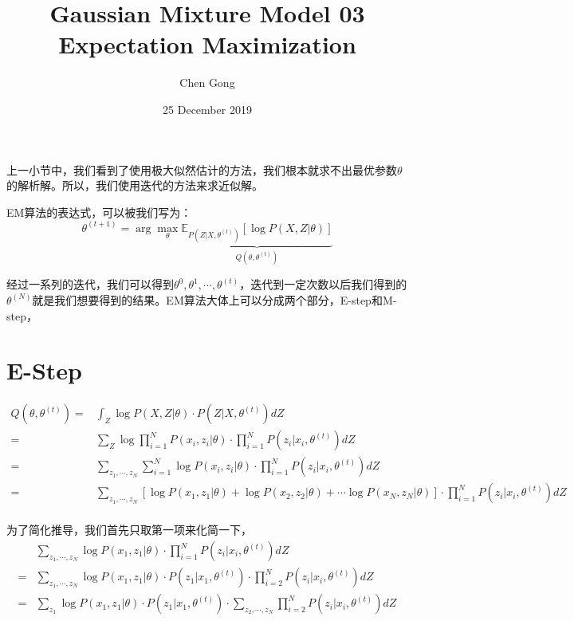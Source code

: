 \documentclass[a4paper]{article}
\title{Gaussian Mixture Model 03 Expectation Maximization}
\author{Chen Gong}
\date{25 December 2019}
\begin{document}
\maketitle
上一小节中，我们看到了使用极大似然估计的方法，我们根本就求不出最优参数$\theta$的解析解。所以，我们使用迭代的方法来求近似解。

EM算法的表达式，可以被我们写为：
\begin{equation}
    \theta^{(t+1)} = \arg\max_\theta \underbrace{\mathbb{E}_{P(Z|X,\theta^{(t)})} \left[ \log P(X,Z|\theta) \right]}_{Q(\theta,\theta^{(t)})}
\end{equation}

经过一系列的迭代，我们可以得到$\theta^{0},\theta^{1},\cdots,\theta^{(t)}$，迭代到一定次数以后我们得到的$\theta^{(N)}$就是我们想要得到的结果。EM算法大体上可以分成两个部分，E-step和M-step，

\section{E-Step}
\begin{equation}
    \begin{split}
        Q(\theta,\theta^{(t)}) 
        = & \int_Z \log P(X,Z|\theta)\cdot P(Z|X,\theta^{(t)}) dZ \\
        = & \sum_Z \log \prod_{i=1}^N P(x_i,z_i|\theta)\cdot \prod_{i=1}^N P(z_i|x_i,\theta^{(t)}) dZ \\
        = & \sum_{z_1,\cdots,z_N} \sum_{i=1}^N \log P(x_i,z_i|\theta)\cdot \prod_{i=1}^N P(z_i|x_i,\theta^{(t)}) dZ \\
        = & \sum_{z_1,\cdots,z_N} \left[ \log P(x_1,z_1|\theta) + \log P(x_2,z_2|\theta) + \cdots \log P(x_N,z_N|\theta) \right] \cdot \prod_{i=1}^N P(z_i|x_i,\theta^{(t)}) dZ \\
    \end{split}
\end{equation}

为了简化推导，我们首先只取第一项来化简一下，
\begin{equation}
    \begin{split}
        & \sum_{z_1,\cdots,z_N} \log P(x_1,z_1|\theta) \cdot \prod_{i=1}^N P(z_i|x_i,\theta^{(t)}) dZ \\
        = & \sum_{z_1,\cdots,z_N} \log P(x_1,z_1|\theta) \cdot P(z_1|x_1,\theta^{(t)}) \cdot \prod_{i=2}^N P(z_i|x_i,\theta^{(t)}) dZ \\
        = & \sum_{z_1} \log P(x_1,z_1|\theta) \cdot  P(z_1|x_1,\theta^{(t)}) \cdot \sum_{z_2,\cdots,z_N} \prod_{i=2}^N P(z_i|x_i,\theta^{(t)}) dZ \\
    \end{split}
\end{equation}
\end{document}
